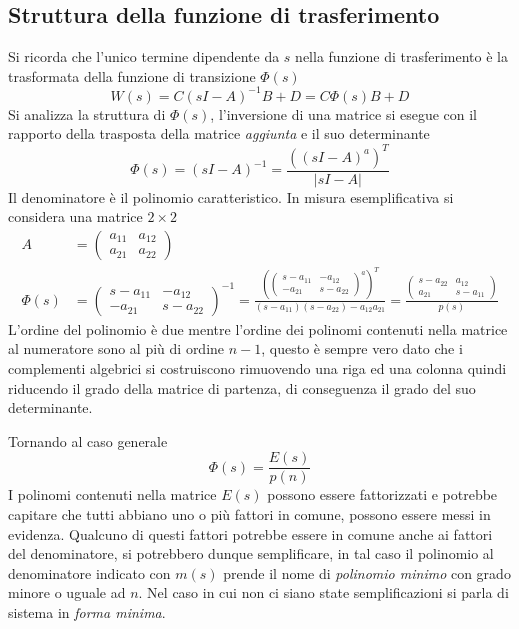 \subsection{Struttura della funzione di trasferimento}
Si ricorda che l'unico termine dipendente da $s$ nella funzione di
trasferimento è la trasformata della funzione di transizione $\Phi(s)$
$$
W(s) = C(sI-A)^{-1} B +D = C\Phi(s) B+D
$$
Si analizza la struttura di $\Phi(s)$, l'inversione di una matrice si esegue
con il rapporto della trasposta della matrice \textit{aggiunta} e il suo
determinante
$$
\Phi(s) = (sI-A)^{-1} = \frac{\left(\left(sI-A\right)^a\right)^T}{|sI-A|}
$$
Il denominatore è il polinomio caratteristico.
\newpage
In misura esemplificativa si considera una matrice $2\times2$
$$\begin{aligned}
A&=\begin{pmatrix}
   a_{11} & a_{12} \\
   a_{21} & a_{22}
  \end{pmatrix}\\
  \Phi(s) &=
\begin{pmatrix}
 s-a_{11} & -a_{12} \\
 -a_{21} & s-a_{22}
\end{pmatrix}^{-1} =
\frac{\left(\begin{pmatrix}
 s-a_{11} & -a_{12} \\
 -a_{21} & s-a_{22}
\end{pmatrix}^a\right)^T}{(s-a_{11})(s-a_{22})-a_{12}a_{21}}
= \frac{\begin{pmatrix}
           s-a_{22} & a_{12} \\
           a_{21} & s-a_{11}
         \end{pmatrix}
}{p(s)}
\end{aligned}$$
L'ordine del polinomio è due mentre l'ordine dei polinomi contenuti nella
matrice al numeratore sono al più di ordine $n-1$, questo è sempre vero dato
che i complementi algebrici si costruiscono rimuovendo una riga ed
una colonna quindi riducendo il grado della matrice di partenza, di conseguenza
il grado del suo determinante.

Tornando al caso generale
$$
\Phi(s) = \frac{E(s)}{p(n)}
$$
I polinomi contenuti nella matrice $E(s)$ possono essere fattorizzati
e potrebbe capitare che tutti abbiano uno o più fattori in comune, possono
essere messi in evidenza. Qualcuno di questi fattori potrebbe essere in comune
anche ai fattori del denominatore, si potrebbero dunque semplificare, in tal
caso il polinomio al denominatore indicato con $m(s)$ prende il nome di
\textit{polinomio minimo} con grado minore o uguale ad $n$.
Nel caso in cui non ci siano state semplificazioni si parla di sistema in
\textit{forma minima}.

